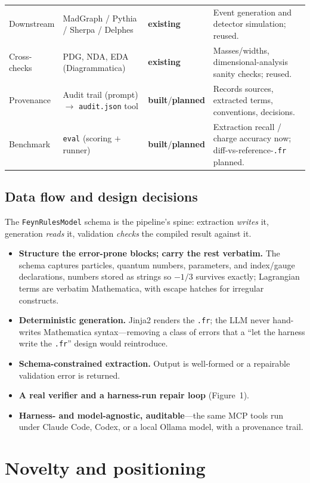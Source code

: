 \documentclass[11pt]{article}
\newcommand{\code}[1]{\texttt{#1}}
\newcommand{\EX}{\textcolor{okgreen}{\textbf{existing}}}
\newcommand{\BU}{\textcolor{accent}{\textbf{built}}}
\newcommand{\PL}{\textcolor{warn}{\textbf{planned}}}
\newcommand{\arw}{$\rightarrow$}
\begin{document}
\begin{longtable}{@{}p{2.0cm} p{4.4cm} p{1.5cm} p{6.4cm}@{}}
Downstream & MadGraph / Pythia / Sherpa / Delphes & \EX & Event generation and detector simulation; reused. \\
Cross-checks & PDG, NDA, EDA (Diagrammatica) & \EX & Masses/widths, dimensional-analysis sanity checks; reused. \\
Provenance & Audit trail (prompt) \arw{} \code{audit.json} tool & \BU/\PL & Records sources, extracted terms, conventions, decisions. \\
Benchmark & \code{eval} (scoring $+$ runner) & \BU/\PL & Extraction recall / charge accuracy now; diff-vs-reference-\code{.fr} planned. \\
\bottomrule
\end{longtable}

\subsection{Data flow and design decisions}

The \code{FeynRulesModel} schema is the pipeline's spine: extraction \emph{writes}
it, generation \emph{reads} it, validation \emph{checks} the compiled result
against it.
\begin{itemize}
  \item \textbf{Structure the error-prone blocks; carry the rest verbatim.} The
  schema captures particles, quantum numbers, parameters, and index/gauge
  declarations, numbers stored as strings so $-1/3$ survives exactly; Lagrangian
  terms are verbatim Mathematica, with escape hatches for irregular constructs.
  \item \textbf{Deterministic generation.} Jinja2 renders the \code{.fr}; the LLM
  never hand-writes Mathematica syntax---removing a class of errors that a
  ``let the harness write the \code{.fr}'' design would reintroduce.
  \item \textbf{Schema-constrained extraction.} Output is well-formed or a
  repairable validation error is returned.
  \item \textbf{A real verifier and a harness-run repair loop} (Figure~1).
  \item \textbf{Harness- and model-agnostic, auditable}---the same MCP tools run
  under Claude Code, Codex, or a local Ollama model, with a provenance trail.
\end{itemize}

\section{Novelty and positioning}
\label{sec:novelty}
\end{document}
